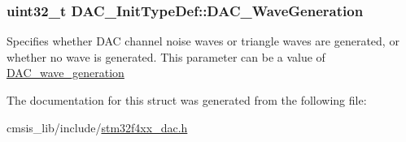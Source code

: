 \subsubsection[{\texorpdfstring{D\+A\+C\+\_\+\+Wave\+Generation}{DAC_WaveGeneration}}]{\setlength{\rightskip}{0pt plus 5cm}uint32\+\_\+t D\+A\+C\+\_\+\+Init\+Type\+Def\+::\+D\+A\+C\+\_\+\+Wave\+Generation}\hypertarget{struct_d_a_c___init_type_def_a6753e78ddd2dc8273444ba01a272d63a}{}\label{struct_d_a_c___init_type_def_a6753e78ddd2dc8273444ba01a272d63a}
Specifies whether D\+AC channel noise waves or triangle waves are generated, or whether no wave is generated. This parameter can be a value of \hyperlink{group___d_a_c__wave__generation}{D\+A\+C\+\_\+wave\+\_\+generation} 

The documentation for this struct was generated from the following file\+:\begin{DoxyCompactItemize}
\item 
cmsis\+\_\+lib/include/\hyperlink{stm32f4xx__dac_8h}{stm32f4xx\+\_\+dac.\+h}\end{DoxyCompactItemize}
